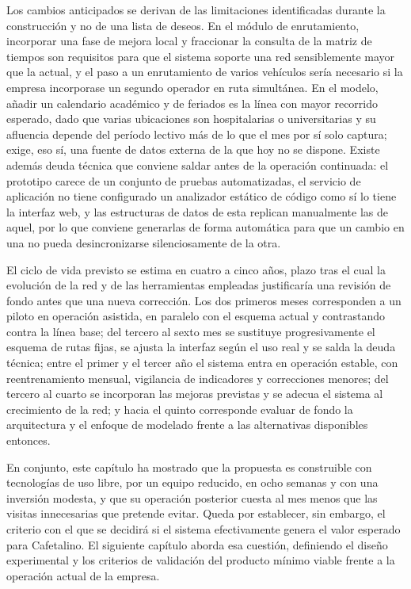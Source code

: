 Los cambios anticipados se derivan de las limitaciones identificadas durante la construcción y no de una lista de deseos. En el módulo de enrutamiento, incorporar una fase de mejora local y fraccionar la consulta de la matriz de tiempos son requisitos para que el sistema soporte una red sensiblemente mayor que la actual, y el paso a un enrutamiento de varios vehículos sería necesario si la empresa incorporase un segundo operador en ruta simultánea. En el modelo, añadir un calendario académico y de feriados es la línea con mayor recorrido esperado, dado que varias ubicaciones son hospitalarias o universitarias y su afluencia depende del período lectivo más de lo que el mes por sí solo captura; exige, eso sí, una fuente de datos externa de la que hoy no se dispone. Existe además deuda técnica que conviene saldar antes de la operación continuada: el prototipo carece de un conjunto de pruebas automatizadas, el servicio de aplicación no tiene configurado un analizador estático de código como sí lo tiene la interfaz web, y las estructuras de datos de esta replican manualmente las de aquel, por lo que conviene generarlas de forma automática para que un cambio en una no pueda desincronizarse silenciosamente de la otra.

El ciclo de vida previsto se estima en cuatro a cinco años, plazo tras el cual la evolución de la red y de las herramientas empleadas justificaría una revisión de fondo antes que una nueva corrección. Los dos primeros meses corresponden a un piloto en operación asistida, en paralelo con el esquema actual y contrastando contra la línea base; del tercero al sexto mes se sustituye progresivamente el esquema de rutas fijas, se ajusta la interfaz según el uso real y se salda la deuda técnica; entre el primer y el tercer año el sistema entra en operación estable, con reentrenamiento mensual, vigilancia de indicadores y correcciones menores; del tercero al cuarto se incorporan las mejoras previstas y se adecua el sistema al crecimiento de la red; y hacia el quinto corresponde evaluar de fondo la arquitectura y el enfoque de modelado frente a las alternativas disponibles entonces.

En conjunto, este capítulo ha mostrado que la propuesta es construible con tecnologías de uso libre, por un equipo reducido, en ocho semanas y con una inversión modesta, y que su operación posterior cuesta al mes menos que las visitas innecesarias que pretende evitar. Queda por establecer, sin embargo, el criterio con el que se decidirá si el sistema efectivamente genera el valor esperado para Cafetalino. El siguiente capítulo aborda esa cuestión, definiendo el diseño experimental y los criterios de validación del producto mínimo viable frente a la operación actual de la empresa.
